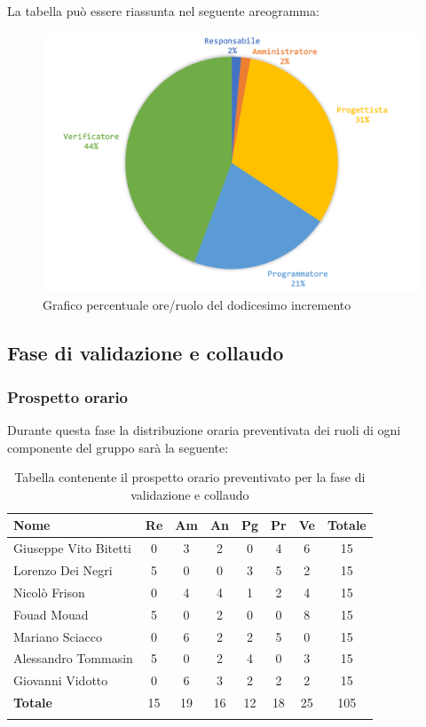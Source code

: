 		La tabella può essere riassunta nel seguente areogramma:
		\begin{figure}[H]
			\centering
			\includegraphics[width=0.8\linewidth]{./images/preventivo/incremento12-2.png}
			\caption{Grafico percentuale ore/ruolo del dodicesimo incremento}
			\label{fig:grafico costi ruolo incremento XII}
		\end{figure}
	
	
	
	\subsection{Fase di validazione e collaudo}
		\subsubsection{Prospetto orario}
		Durante questa fase la distribuzione oraria preventivata dei ruoli di ogni componente del gruppo sarà la seguente:
		
		\begin{longtable}{|l|c|c|c|c|c|c|c|}
			\hline
			\rowcolor{lighter-grayer}
			\textbf{Nome} & \textbf{Re} & \textbf{Am} & \textbf{An} & \textbf{Pg}  & \textbf{Pr}   & \textbf{Ve} & \textbf{Totale} \\
			\hline
			\endfirsthead
			
			\hline
			Giuseppe Vito Bitetti 		 & 0 & 3 & 2 & 0 & 4 & 6 & 15\\
			\hline
			\hline
			Lorenzo Dei Negri			 & 5 & 0 & 0 & 3 & 5 & 2 & 15\\
			\hline
			\hline
			Nicolò Frison				      & 0 & 4 & 4 & 1 & 2 & 4 & 15\\
			\hline
			\hline
			Fouad Mouad 				   & 5 & 0 & 2 & 0 & 0 & 8 & 15\\
			\hline
			\hline
			Mariano Sciacco 			 & 0 & 6 & 2 & 2 & 5 & 0 & 15\\
			\hline
			\hline
			Alessandro Tommasin    & 5 & 0 & 2 & 4 & 0 & 3 & 15\\
			\hline
			\hline
			Giovanni Vidotto 			  & 0 & 6 & 3 & 2 & 2 & 2 & 15\\
			\hline 
			\textbf{Totale}			 	& 15 & 19 & 16 & 12 & 18 & 25 & 105\\
			\hline
			\caption{Tabella contenente il prospetto orario preventivato per la fase di validazione e collaudo}
		\end{longtable}
		\pagebreak
		
